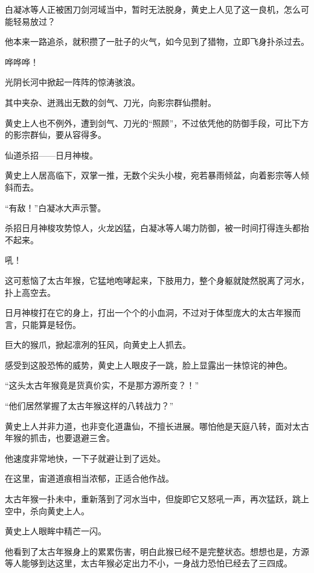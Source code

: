 
\begin{this_body}

白凝冰等人正被困刀剑河域当中，暂时无法脱身，黄史上人见了这一良机，怎么可能轻易放过？

他本来一路追杀，就积攒了一肚子的火气，如今见到了猎物，立即飞身扑杀过去。

哗哗哗！

光阴长河中掀起一阵阵的惊涛骇浪。

其中夹杂、迸溅出无数的剑气、刀光，向影宗群仙攒射。

黄史上人也不例外，遭到剑气、刀光的“照顾”，不过依凭他的防御手段，可比下方的影宗群仙，要从容得多。

仙道杀招——日月神梭。

黄史上人居高临下，双掌一推，无数个尖头小梭，宛若暴雨倾盆，向着影宗等人倾斜而去。

“有敌！”白凝冰大声示警。

杀招日月神梭攻势惊人，火龙凶猛，白凝冰等人竭力防御，被一时间打得连头都抬不起来。

吼！

这可惹恼了太古年猴，它猛地咆哮起来，下肢用力，整个身躯就陡然脱离了河水，扑上高空去。

日月神梭打在它的身上，打出一个个的小血洞，不过对于体型庞大的太古年猴而言，只能算是轻伤。

巨大的猴爪，掀起凛冽的狂风，向黄史上人抓去。

感受到这股恐怖的威势，黄史上人眼皮子一跳，脸上显露出一抹惊诧的神色。

“这头太古年猴竟是货真价实，不是那方源所变？！”

“他们居然掌握了太古年猴这样的八转战力？”

黄史上人并非力道，也非变化道蛊仙，不擅长进展。哪怕他是天庭八转，面对太古年猴的抓击，也要退避三舍。

他速度非常地快，一下子就避让到了远处。

在这里，宙道道痕相当浓郁，正适合他作战。

太古年猴一扑未中，重新落到了河水当中，但旋即它又怒吼一声，再次猛跃，跳上空中，杀向黄史上人。

黄史上人眼眸中精芒一闪。

他看到了太古年猴身上的累累伤害，明白此猴已经不是完整状态。想想也是，方源等人能够到达这里，太古年猴必定出力不小，一身战力恐怕已经去了三四成。


\end{this_body}
